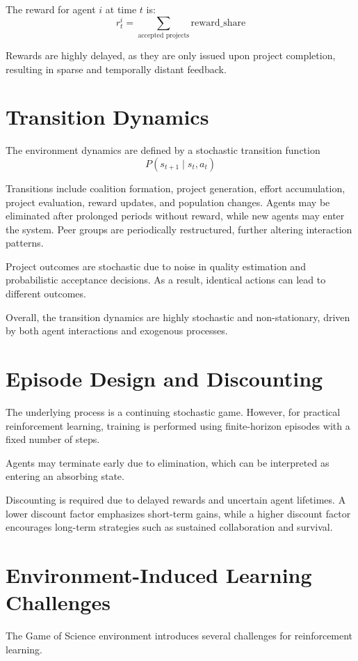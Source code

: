 \documentclass[english,bachelor]{hsluthesis}
\begin{document}
The reward for agent $i$ at time $t$ is:
$$
r_t^i = \sum_{\text{accepted projects}} \text{reward\_share}
$$

Rewards are highly delayed, as they are only issued upon project completion, resulting in sparse and temporally distant feedback.

\section{Transition Dynamics}
The environment dynamics are defined by a stochastic transition function 
$$
P(s_{t+1} \mid s_t, a_t)
$$

Transitions include coalition formation, project generation, effort accumulation, project evaluation, reward updates, and population changes. Agents may be eliminated after prolonged periods without reward, while new agents may enter the system. Peer groups are periodically restructured, further altering interaction patterns.

Project outcomes are stochastic due to noise in quality estimation and probabilistic acceptance decisions. As a result, identical actions can lead to different outcomes.

Overall, the transition dynamics are highly stochastic and non-stationary, driven by both agent interactions and exogenous processes.

\section{Episode Design and Discounting}
The underlying process is a continuing stochastic game. However, for practical reinforcement learning, training is performed using finite-horizon episodes with a fixed number of steps.

Agents may terminate early due to elimination, which can be interpreted as entering an absorbing state.

Discounting is required due to delayed rewards and uncertain agent lifetimes. A lower discount factor emphasizes short-term gains, while a higher discount factor encourages long-term strategies such as sustained collaboration and survival.

\section{Environment-Induced Learning Challenges}
The Game of Science environment introduces several challenges for reinforcement learning.
\end{document}
